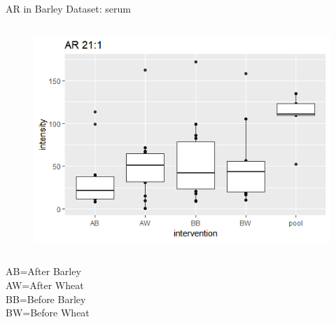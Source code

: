 \documentclass{beamer}
\begin{document}
\begin{frame}{AR in Barley Dataset: serum}
\begin{columns}
		\begin{figure}[h]
		\centering
		\includegraphics[scale=0.4]{images/ar211.PNG}
	\end{figure}
	\end{columns}
\tiny
AB=After Barley \\
AW=After Wheat \\
BB=Before Barley\\
BW=Before Wheat \\
\end{frame}
\end{document}
